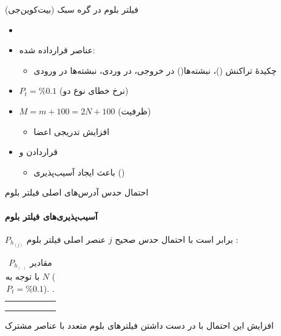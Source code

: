 \documentclass{beamer}
\begin{document}
\begin{frame}{فیلتر بلوم در گره سبک (بیت‌کوین‌جی)}
	
	\begin{itemize}
		\item {}
		\item {%
			عناصر قرارداده شده:
			\begin{itemize}
				\item {
				چکیدهٔ تراکنش ()، نبشته‌ها() در خروجی،  در وردی، نبشته‌ها در ورودی}
			\end{itemize}
		}
		\item{$P_t=\%0.1$
		(نرخ خطای نوع دو)}
		\item{$M = m + 100 = 2N + 100$
		(ظرفیت)
			\begin{itemize}
				\item افزایش تدریجی اعضا
			\end{itemize}
		}
		\item{%
			قراردادن  و 
			\begin{itemize}
				\item {باعث ایجاد آسیب‌پذیری
					 ()}
			\end{itemize}
		}
	\end{itemize}
\end{frame}

\begin{frame}{احتمال حدس آدرس‌های اصلی فیلتر بلوم}
	\framesubtitle{آسیب‌پذیری‌های فیلتر بلوم}
	$P_{h_{(j)}}$ 
	برابر است با احتمال حدس صحیح $j$ عنصر اصلی فیلتر بلوم \cite{Gervais2014}:
	\begin{table}
		
		\caption{%
			مقادیر 
			$P_{h_{(.)}}$
			با توجه به $N$
			($P_t=\%0.1$).
			\cite{Gervais2014}.
		}
		\label{table:P_h}
		\centering
		\begin{tabular}{|c|c|c|c|c|c|}
			\hline 
			\lr{$N$} & \lr{$1$} & \lr{$19$} & \lr{$49$}& \lr{$54$} & \lr{$8,999$}\\
			\hline
			\lr{$P_{h_{(1)}}$} & \lr{$1$} & \lr{$0.42$} & \lr{$0.0021$} & \lr{$0.14$} & \lr{$0.21$}\\
			\lr{$P_{h_{([N/2])}}$} & \lr{$-$} & \lr{$0.000026$} & \lr{$0$} & \lr{$0$} & \lr{$0$}\\
			\lr{$P_{h_{([N])}}$} & \lr{$1$} & \lr{$0$} & \lr{$0$} & \lr{$0$} & \lr{$0$}\\
			\hline
			
		\end{tabular}
		
	\end{table}
	افزایش این احتمال با در دست داشتن فیلتر‌های بلوم متعدد با عناصر مشترک
\end{frame}
\end{document}
